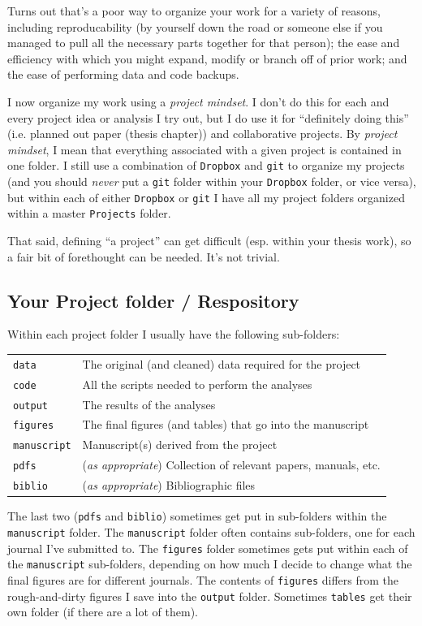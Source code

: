 \documentclass[12pt,letterpaper]{article}
\begin{document}
Turns out that's a poor way to organize your work for a variety of reasons, including reproducability (by yourself down the road or someone else if you managed to pull all the necessary parts together for that person); the ease and efficiency with which you might expand, modify or branch off of prior work; and the ease of performing data and code backups.

I now organize my work using a \emph{project mindset}.  I don't do this for each and every project idea or analysis I try out, but I do use it for ``definitely doing this'' (i.e.  planned out paper (thesis chapter)) and collaborative projects.  By \emph{project mindset}, I mean that everything associated with a given project is contained in one folder.   I still use a combination of \texttt{Dropbox} and \texttt{git} to organize my projects (and you should \emph{never} put a \texttt{git} folder within your \texttt{Dropbox} folder, or vice versa), but within each of either \texttt{Dropbox} or \texttt{git} I have all my project folders organized within a master \texttt{Projects} folder.   

That said, defining ``a project'' can get difficult (esp. within your thesis work), so a fair bit of forethought can be needed.  It's not trivial.

\subsection{Your Project folder / Respository} \label{projectfolder}
Within each project folder I  usually have the following sub-folders:

\begin{tabular}{ll}
 \texttt{data} & The original (and cleaned) data required for the project\\
 \texttt{code} & All the scripts needed to perform the analyses \\
 \texttt{output} & The results of the analyses \\
 \texttt{figures} & The final figures (and tables) that go into the manuscript\\
 \texttt{manuscript} & Manuscript(s) derived from the project\\
 \texttt{pdfs} & (\emph{as appropriate}) Collection of relevant papers, manuals, etc.\\
 \texttt{biblio} & (\emph{as appropriate}) Bibliographic files\\
\end{tabular}

The last two (\texttt{pdfs} and \texttt{biblio}) sometimes get put in sub-folders within the \texttt{manuscript} folder.  The  \texttt{manuscript} folder often contains sub-folders, one for each journal I've submitted to.  The \texttt{figures} folder sometimes gets put within each of the  \texttt{manuscript} sub-folders, depending on how much I decide to change what the final figures are for different journals.  The contents of \texttt{figures} differs from the rough-and-dirty figures I save into the \texttt{output} folder.  Sometimes \texttt{tables} get their own folder (if there are a lot of them). 
\end{document}
